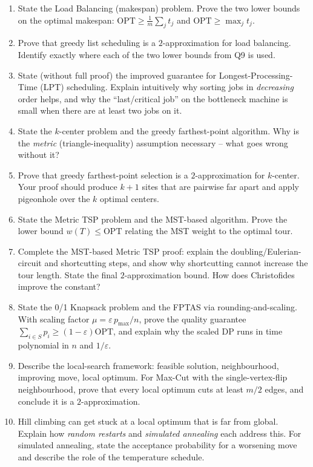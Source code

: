 \documentclass[11pt]{article}
\begin{document}
\begin{enumerate}[label=\textbf{A\arabic*.}, leftmargin=2.2em]
\item State the Load Balancing (makespan) problem. Prove the two lower bounds on the
optimal makespan: $\mathrm{OPT} \ge \frac{1}{m}\sum_j t_j$ and $\mathrm{OPT} \ge \max_j
t_j$.

\item Prove that greedy list scheduling is a $2$-approximation for load balancing. Identify
exactly where each of the two lower bounds from Q9 is used.

\item State (without full proof) the improved guarantee for Longest-Processing-Time (LPT)
scheduling. Explain intuitively why sorting jobs in \emph{decreasing} order helps, and why
the ``last/critical job'' on the bottleneck machine is small when there are at least two
jobs on it.

\item State the $k$-center problem and the greedy farthest-point algorithm. Why is the
\emph{metric} (triangle-inequality) assumption necessary -- what goes wrong without it?

\item Prove that greedy farthest-point selection is a $2$-approximation for $k$-center.
Your proof should produce $k+1$ sites that are pairwise far apart and apply pigeonhole over
the $k$ optimal centers.

\item State the Metric TSP problem and the MST-based algorithm. Prove the lower bound
$w(T) \le \mathrm{OPT}$ relating the MST weight to the optimal tour.

\item Complete the MST-based Metric TSP proof: explain the doubling/Eulerian-circuit and
shortcutting steps, and show why shortcutting cannot increase the tour length. State the
final $2$-approximation bound. How does Christofides improve the constant?

\item State the 0/1 Knapsack problem and the FPTAS via rounding-and-scaling. With scaling
factor $\mu = \varepsilon\, p_{\max}/n$, prove the quality guarantee $\sum_{i\in S} p_i \ge
(1-\varepsilon)\mathrm{OPT}$, and explain why the scaled DP runs in time polynomial in
$n$ and $1/\varepsilon$.

\item Describe the local-search framework: feasible solution, neighbourhood, improving
move, local optimum. For Max-Cut with the single-vertex-flip neighbourhood, prove that
every local optimum cuts at least $m/2$ edges, and conclude it is a $2$-approximation.

\item Hill climbing can get stuck at a local optimum that is far from global. Explain how
\emph{random restarts} and \emph{simulated annealing} each address this. For simulated
annealing, state the acceptance probability for a worsening move and describe the role of
the temperature schedule.

\end{enumerate}
\end{document}
